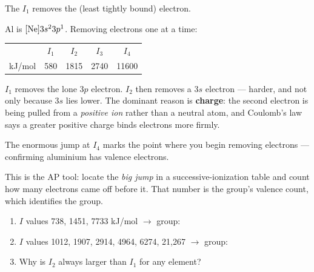 \documentclass{apchem-notes}
\begin{document}

The  $I_1$ removes the
 (least tightly bound) electron.

\begin{workedexample}
Al is $[\ce{Ne}]3s^2 3p^1$. Removing electrons one at a time:
\renewcommand{\arraystretch}{1.2}
\begin{center}
\begin{tabular}{@{}lcccc@{}}
\toprule
 & $I_1$ & $I_2$ & $I_3$ & $I_4$\\
kJ/mol & 580 & 1815 & 2740 & 11600\\
\bottomrule
\end{tabular}
\end{center}
$I_1$ removes the lone 3$p$ electron. $I_2$ then removes a 3$s$ electron ---
harder, and not only because 3$s$ lies lower. The dominant reason is
\textbf{charge}: the second electron is being pulled from a
\emph{positive ion} rather than a neutral atom, and Coulomb's law says a
greater positive charge binds electrons more firmly.

The enormous jump at $I_4$ marks the point where you begin removing
 electrons --- confirming aluminium has
 valence electrons.
\end{workedexample}

\begin{apcnote}
This is the AP tool: locate the \emph{big jump} in a successive-ionization
table and count how many electrons came off before it. That number is the
group's valence count, which identifies the group.
\end{apcnote}


\begin{enumerate}[leftmargin=*,itemsep=0.35em]
  \item $I$ values 738, 1451, 7733 kJ/mol $\to$ group:
  \item $I$ values 1012, 1907, 2914, 4964, 6274, 21{,}267 $\to$ group:
  \item Why is $I_2$ always larger than $I_1$ for any element?
\end{enumerate}
\end{document}
